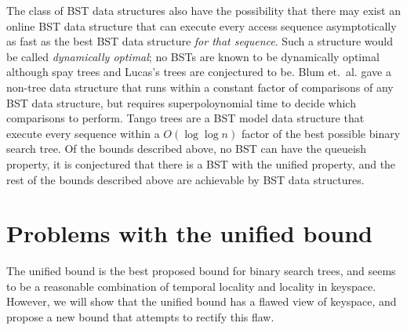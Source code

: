 \documentclass{llncs}
\newcommand{\eg}{\textsl{e.g.}}
\begin{document}
The class of BST data structures also have the possibility that there may exist an online BST data structure that can execute every access sequence asymptotically as fast as the best BST data structure \emph{for that sequence}. Such a structure would be called \emph{dynamically optimal}; no BSTs are known to be dynamically optimal although spay trees and Lucas's trees are conjectured to be. Blum et.~al. gave a non-tree data structure that runs within a constant factor of comparisons of any BST data structure, but requires superpoloynomial time to decide which comparisons to perform. Tango trees \cite{DBLP:journals/siamcomp/DemaineHIP07} are a BST model data structure that execute every sequence within a $O(\log \log n)$ factor of the best possible binary search tree. Of the bounds described above, no BST can have the queueish property, it is conjectured that there is a BST with the unified property, and the rest of the bounds described above are achievable by BST data structures.

\section{Problems with the unified bound}

The unified bound is the best proposed bound for binary search trees, and seems to be a reasonable combination of temporal locality and locality in keyspace. However, we will show that the unified bound has a flawed view of keyspace, and propose a new bound that attempts to rectify this flaw.


%
%
%
\end{document}
